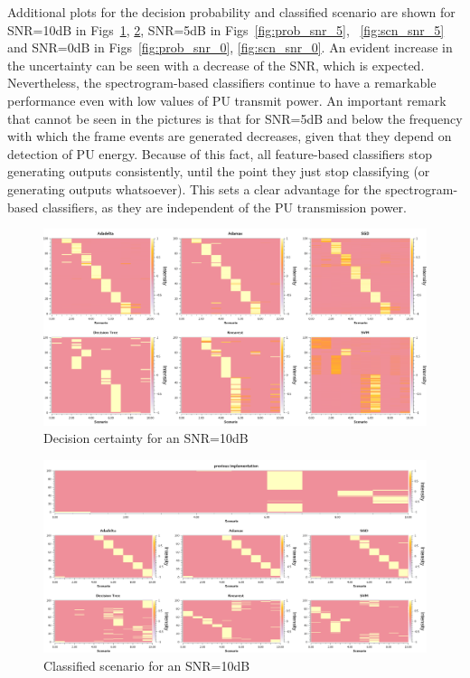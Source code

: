 Additional plots for the decision probability and classified scenario are shown for SNR=10dB in Figs~\ref{fig:prob_snr_10}, \ref{fig:scn_snr_10}, SNR=5dB in Figs~\ref{fig:prob_snr_5}, ~\ref{fig:scn_snr_5} and SNR=0dB in Figs~\ref{fig:prob_snr_0}, \ref{fig:scn_snr_0}. An evident increase in the uncertainty can be seen with a decrease of the SNR, which is expected. Nevertheless, the spectrogram-based classifiers continue to have a remarkable performance even with low values of \ac{PU} transmit power. An important remark that cannot be seen in the pictures is that for SNR=5dB and below the frequency with which the frame events are generated decreases, given that they depend on detection of \ac{PU} energy. Because of this fact, all feature-based classifiers stop generating outputs consistently, until the point they just stop classifying (or generating outputs whatsoever). This sets a clear advantage for the spectrogram-based classifiers, as they are independent of the \ac{PU} transmission power.

\begin{figure}[!htb]
    \centering
      \includegraphics[width=\textwidth]{figures/prob_snr_10}
      \caption{Decision certainty for an SNR=10dB}
      \label{fig:prob_snr_10}
\end{figure}

\begin{figure}[!htb]
    \centering
      \includegraphics[width=\textwidth]{figures/scn_snr_10}
      \caption{Classified scenario for an SNR=10dB}
      \label{fig:scn_snr_10}
\end{figure}

